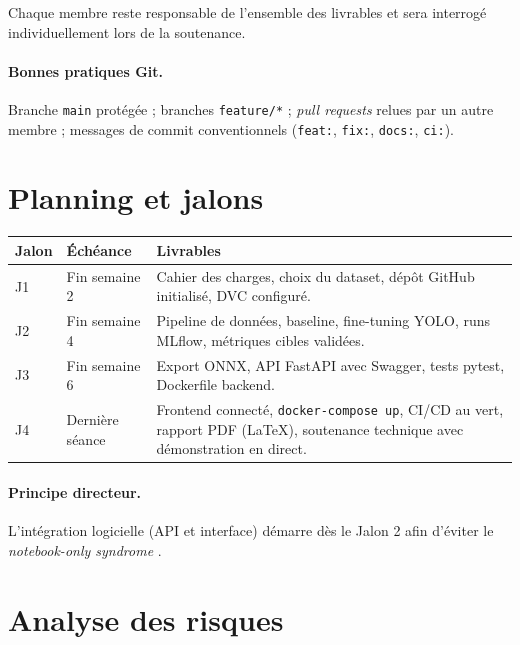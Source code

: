\documentclass[11pt,a4paper]{article}
\begin{document}
Chaque membre reste responsable de l'ensemble des livrables et sera interrogé individuellement lors de la soutenance.

\paragraph{Bonnes pratiques Git.} Branche \texttt{main} protégée ; branches \texttt{feature/*} ; \textit{pull requests} relues par un autre membre ; messages de commit conventionnels (\texttt{feat:}, \texttt{fix:}, \texttt{docs:}, \texttt{ci:}).

\section{Planning et jalons}

\begin{center}
\begin{tabular}{@{}llp{7.2cm}@{}}
\toprule
\textbf{Jalon} & \textbf{Échéance} & \textbf{Livrables} \\ \midrule
J1 & Fin semaine 2 & Cahier des charges, choix du dataset, dépôt GitHub initialisé, DVC configuré. \\
J2 & Fin semaine 4 & Pipeline de données, baseline, fine-tuning YOLO, runs MLflow, métriques cibles validées. \\
J3 & Fin semaine 6 & Export ONNX, API FastAPI avec Swagger, tests pytest, Dockerfile backend. \\
J4 & Dernière séance & Frontend connecté, \texttt{docker-compose up}, CI/CD au vert, rapport PDF (LaTeX), soutenance technique avec démonstration en direct. \\ \bottomrule
\end{tabular}
\end{center}

\paragraph{Principe directeur.} L'intégration logicielle (API et interface) démarre dès le Jalon 2 afin d'éviter le \og \textit{notebook-only syndrome} \fg.

\section{Analyse des risques}
\end{document}
